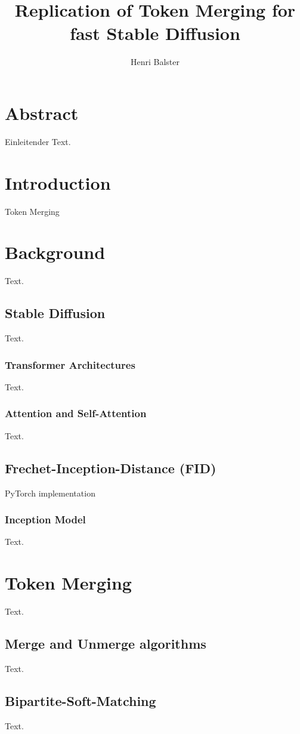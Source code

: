 \documentclass{article}
\title{{\myfont Replication of Token Merging for fast Stable Diffusion}}
\author{Henri Balster}
\date{}
\begin{document}
\maketitle

\tableofcontents

\section*{Abstract}
Einleitender Text.

\newpage
\section{Introduction}
Token Merging \cite{bolya2023tomesd}

\section{Background}
Text.
\subsection{Stable Diffusion}
Text.
\subsubsection{Transformer Architectures}
Text.
\subsubsection{Attention and Self-Attention}
Text.
\subsection{Frechet-Inception-Distance (FID)}
PyTorch implementation \cite{Seitzer2020FID}
\subsubsection{Inception Model}
Text.

\section{Token Merging}
Text.
\subsection{Merge and Unmerge algorithms}
Text.
\subsection{Bipartite-Soft-Matching}
Text.
\end{document}
